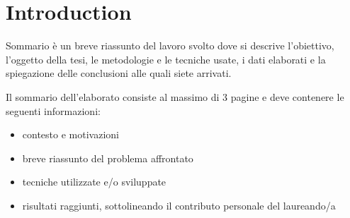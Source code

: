 \chapter*{Introduction} %
\label{Introduction}


Sommario è un breve riassunto del lavoro svolto dove si descrive l'obiettivo, l'oggetto della tesi, le 
metodologie e le tecniche usate, i dati elaborati e la spiegazione delle conclusioni alle quali siete arrivati.  

Il sommario dell’elaborato consiste al massimo di 3 pagine e deve contenere le seguenti informazioni:
\begin{itemize}
  \item contesto e motivazioni 
  \item breve riassunto del problema affrontato
  \item tecniche utilizzate e/o sviluppate
  \item risultati raggiunti, sottolineando il contributo personale del laureando/a
\end{itemize}


